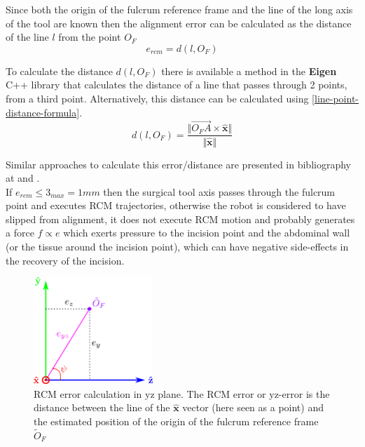 Since both the origin of the fulcrum reference frame and the line of the long axis of the tool are known then the alignment error can be calculated as the distance of the line $l$ from the point $O_F$
\begin{equation}
e_{rcm} = d(l, O_F)
\end{equation}

To calculate the distance $d(l, O_F)$ there is available a method in the \textbf{Eigen} C++ library that calculates the distance of a line that passes through 2 points, from a third point. Alternatively, this distance 
can be calculated using \ref{line-point-distance-formula}.
\begin{equation}
\label{line-point-distance-formula}
d(l, O_F) = \frac{\Vert \overrightarrow{O_FA} \times \mathbf{\hat{x}} \Vert}{\Vert \mathbf{\hat{x}} \Vert}
\end{equation}

Similar approaches to calculate this error/distance are presented in bibliography at \cite{Dong2016RobustTD} and \cite{Bauzano2009ControlMF}.\\

If $e_{rcm} \leq 3_{max} = 1mm$ then the surgical tool axis passes through the fulcrum point and executes RCM trajectories, otherwise the robot is considered to have slipped from alignment, it does not execute RCM motion and 
probably generates a force $f \propto e$ which exerts pressure to the incision point and the abdominal wall (or the tissue around the incision point), which can have negative side-effects in the recovery of the incision.\\

\begin{center}
\begin{figure}[!htb]
\centering
\includegraphics[width=0.4\textwidth]{images/rcm-error-yz.png}
\caption{RCM error calculation in yz plane. The RCM error or yz-error is the distance between the line of the $\mathbf{\hat{x}}$ vector (here seen as a point) and the estimated position of the origin of the
fulcrum reference frame $\tilde{O}_F$}
\label{rcm-error-yz-plane}
\end{figure}
\end{center}

